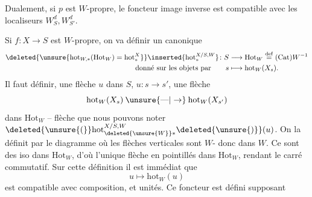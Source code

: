 
Dualement, si $p$ est $W$-propre, le foncteur image inverse est compatible avec les localiseurs $W_S^d, W_{S'}^d$.

Si $f\colon X\to S$ est $W$-propre, on va définir un   canonique
\[
\begin{aligned}
\deleted{\unsure{\mathrm{hot}_{W, *}(\mathrm{Hot}_{W})=\mathrm{hot}^{X}_{*}}}
\inserted{\mathrm{hot}^{X/S,W}_{*}}\colon S&\longrightarrow\mathrm{Hot}_W\overset{\mathrm{def}}{=}(\mathrm{Cat})W^{-1}\\
\text{donné sur les objets par}\qquad s&\longmapsto\mathrm{hot}_W(X_s).
\end{aligned}
\]
Il faut définir,  une flèche $u$ dans $S$, $u\colon s\longrightarrow s'$, une flèche
\[
\mathrm{hot}_W(X_s)\mathbin{\unsure{\text{---}|\to}}\mathrm{hot}_W(X_{s'})
\]
dans $\mathrm{Hot}_W$ -- flèche que nous pouvons noter $\deleted{\unsure{(}}\mathrm{hot}_{\deleted{\unsure{W}}*}^{X/S,W}\deleted{\unsure{)}}(u)$. On la définit par le diagramme
où les flèches verticales sont $W$- donc dans $W$. Ce sont  des iso dans $\mathrm{Hot}_W$, d'où l'unique flèche en pointillés dans $\mathrm{Hot}_W$, rendant le carré commutatif. Sur cette définition il est immédiat que
\[
u\longmapsto\mathrm{hot}_W(u)
\]
est compatible avec composition, et unités. Ce foncteur est  défini   supposant

